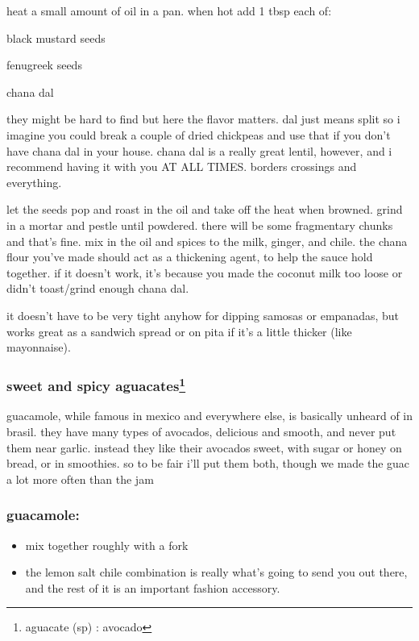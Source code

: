 heat a small amount of oil in a pan. when hot add 1 tbsp each of:

\begin{ingredients}
  \item black mustard seeds
  \item fenugreek seeds
  \item chana dal
\end{ingredients}

they might be hard to find but here the flavor matters. dal just means split 
so i imagine you could break a couple of dried chickpeas and use that if you 
don't have chana dal in your house. chana dal is a really great lentil, 
however, and i recommend having it with you AT ALL TIMES. borders crossings 
and everything.

let the seeds pop and roast in the oil and take off the heat when browned. 
grind in a mortar and pestle until powdered. there will be some fragmentary 
chunks and that's fine. mix in the oil and spices to the milk, ginger, and 
chile. the chana flour you've made should act as a thickening agent, to help 
the sauce hold together. if it doesn't work, it's because you made the coconut 
milk too loose or didn't toast/grind enough chana dal.

it doesn't have to be very tight anyhow for dipping samosas or empanadas, but 
works great as a sandwich spread or on pita if it's a little thicker (like 
mayonnaise).

\subsubsection{sweet and spicy aguacates\footnote{aguacate (sp) : avocado}}

guacamole, while famous in mexico and everywhere else, is basically unheard of 
in brasil. they have many types of avocados, delicious and smooth, and never 
put them near garlic. instead they like their avocados sweet, with sugar or 
honey on bread, or in smoothies. so to be fair i'll put them both, though we 
made the guac a lot more often than the jam

\subsubsection{guacamole:}

\begin{itemize}
  \item mix together roughly with a fork
  \item the lemon salt chile combination is really what's going to send you 
  out there, and the rest of it is an important fashion accessory.
\end{itemize}

